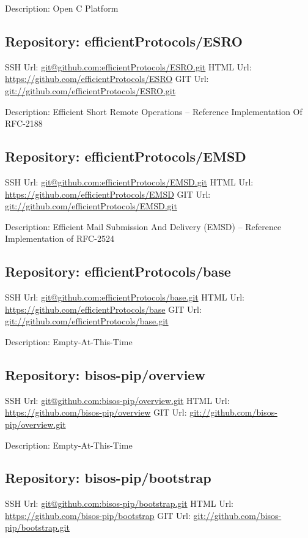 Description: Open C Platform

\subsection{Repository: efficientProtocols/ESRO}

SSH Url:  \url{git@github.com:efficientProtocols/ESRO.git}
HTML Url: \url{https://github.com/efficientProtocols/ESRO}
GIT Url:  \url{git://github.com/efficientProtocols/ESRO.git}

Description: Efficient Short Remote Operations -- Reference Implementation Of RFC-2188

\subsection{Repository: efficientProtocols/EMSD}

SSH Url:  \url{git@github.com:efficientProtocols/EMSD.git}
HTML Url: \url{https://github.com/efficientProtocols/EMSD}
GIT Url:  \url{git://github.com/efficientProtocols/EMSD.git}

Description: Efficient Mail Submission And Delivery  (EMSD) -- Reference Implementation of RFC-2524

\subsection{Repository: efficientProtocols/base}

SSH Url:  \url{git@github.com:efficientProtocols/base.git}
HTML Url: \url{https://github.com/efficientProtocols/base}
GIT Url:  \url{git://github.com/efficientProtocols/base.git}

Description: Empty-At-This-Time

\subsection{Repository: bisos-pip/overview}

SSH Url:  \url{git@github.com:bisos-pip/overview.git}
HTML Url: \url{https://github.com/bisos-pip/overview}
GIT Url:  \url{git://github.com/bisos-pip/overview.git}

Description: Empty-At-This-Time

\subsection{Repository: bisos-pip/bootstrap}

SSH Url:  \url{git@github.com:bisos-pip/bootstrap.git}
HTML Url: \url{https://github.com/bisos-pip/bootstrap}
GIT Url:  \url{git://github.com/bisos-pip/bootstrap.git}

